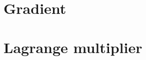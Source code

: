 \documentclass[letterpaper,oneside,french]{book}
\begin{document}
\section{Gradient}
\section{Lagrange multiplier}


\nocite{*}
\newpage
%



\appendix



\end{document}
